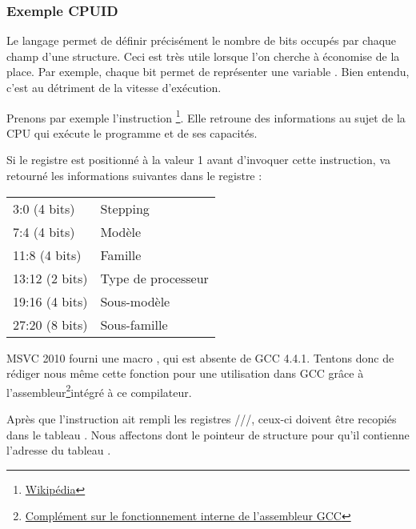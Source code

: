 ﻿\subsubsection{Exemple CPUID}

Le langage \CCpp permet de définir précisément le nombre de bits occupés par chaque champ d'une structure. 
Ceci est très utile lorsque l'on cherche à économise de la place. Par exemple, chaque bit permet de 
représenter une variable \Tbool. Bien entendu, c'est au détriment de la vitesse d'exécution.

\newcommand{\FNCPUID}{\footnote{\href{http://go.yurichev.com/17069}{Wikipédia}}}

\label{cpuid}

Prenons par exemple l'instruction \CPUID\FNCPUID. Elle retroune des informations au sujet de la CPU qui 
exécute le programme et de ses capacités.

Si le registre \EAX est positionné à la valeur 1 avant d'invoquer cette instruction, \CPUID va retourné 
les informations suivantes dans le registre \EAX:

\begin{center}
\begin{tabular}{ | l | l | }
\hline
3:0 (4 bits)& Stepping \\
7:4 (4 bits) & Modèle \\
11:8 (4 bits) & Famille \\
13:12 (2 bits) & Type de processeur \\
19:16 (4 bits) & Sous-modèle \\
27:20 (8 bits) & Sous-famille \\
\hline
\end{tabular}
\end{center}

\newcommand{\FNGCCAS}{\footnote{\href{http://go.yurichev.com/17070}
{Complément sur le fonctionnement interne de l'assembleur GCC}}}

MSVC 2010 fourni une macro \CPUID, qui est absente de GCC 4.4.1. Tentons donc de rédiger nous même cette 
fonction pour une utilisation dans GCC grâce à l'assembleur\FNGCCAS intégré à ce compilateur.



Après que l'instruction \CPUID ait rempli les registres \EAX/\EBX/\ECX/\EDX, ceux-ci doivent être recopiés 
dans le tableau . Nous affectons dont le pointeur de structure  pour qu'il 
contienne l'adresse du tableau .

